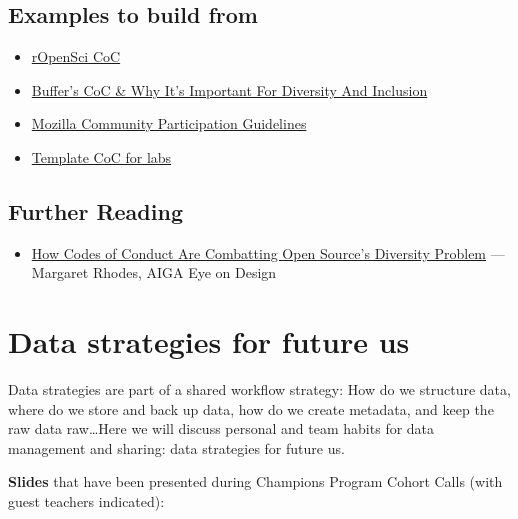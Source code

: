 \documentclass[
  letterpaper,
  DIV=11,
  numbers=noendperiod]{scrreprt}
\providecommand{\tightlist}{%
  \setlength{\itemsep}{0pt}\setlength{\parskip}{0pt}}
\begin{document}
\hypertarget{examples-to-build-from}{%
\section{Examples to build from}\label{examples-to-build-from}}

\begin{itemize}
\tightlist
\item
  \href{https://ropensci.org/code-of-conduct/}{rOpenSci CoC}\\
\item
  \href{https://open.buffer.com/code-of-conduct/}{Buffer's CoC \& Why
  It's Important For Diversity And Inclusion}
\item
  \href{https://www.mozilla.org/en-US/about/governance/policies/participation/}{Mozilla
  Community Participation Guidelines}
\item
  \href{https://github.com/dasaderi/Lab_CoC_templates/blob/master/CODE_OF_CONDUCT.md}{Template
  CoC for labs}
\end{itemize}

\hypertarget{further-reading}{%
\section{Further Reading}\label{further-reading}}

\begin{itemize}
\tightlist
\item
  \href{https://eyeondesign.aiga.org/are-codes-of-conduct-changing-the-diversity-stats-in-open-source/}{How
  Codes of Conduct Are Combatting Open Source's Diversity Problem} ---
  Margaret Rhodes, AIGA Eye on Design
\end{itemize}

\hypertarget{data-strategies}{%
\chapter{Data strategies for future us}\label{data-strategies}}

Data strategies are part of a shared workflow strategy: How do we
structure data, where do we store and back up data, how do we create
metadata, and keep the raw data raw\ldots Here we will discuss personal
and team habits for data management and sharing: data strategies for
future us.

\textbf{Slides} that have been presented during Champions Program Cohort
Calls (with guest teachers indicated):
\end{document}
